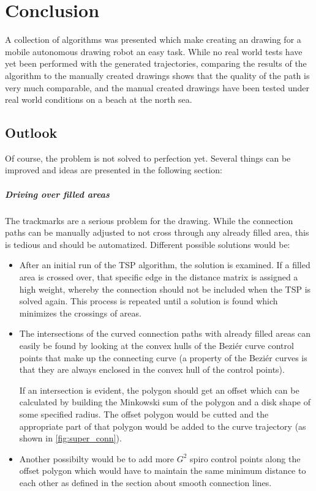 \chapter{Conclusion}

A collection of algorithms was presented which make creating an drawing for a mobile autonomous drawing robot an easy task. While no real world tests have yet been performed with the generated trajectories, comparing the results of the algorithm to the manually created drawings shows that the quality of the path is very much comparable, and the manual created drawings have been tested under real world conditions on a beach at the north sea.

\section{Outlook}
Of course, the problem is not solved to perfection yet. Several things can be improved and ideas are presented in the following section:

\paragraph{Driving over filled areas} The trackmarks are a serious problem for the drawing. While the connection paths can be manually adjusted to not cross through any already filled area, this is tedious and should be automatized. Different possible solutions would be:
\begin{itemize}
\item After an initial run of the TSP algorithm, the solution is examined. If a filled area is crossed over, that specific edge in the distance matrix is assigned a high weight, whereby the connection should not be included when the TSP is solved again. This process is repeated until a solution is found which minimizes the crossings of areas.
\item The intersections of the curved connection paths with already filled areas can easily be found by looking at the convex hulls of the Beziér curve control points that make up the connecting curve (a property of the Beziér curves is that they are always enclosed in the convex hull of the control points). 

If an intersection is evident, the polygon should get an offset which can be calculated by building the Minkowski sum of the polygon and a disk shape of some specified radius.  The offset polygon would be cutted and the appropriate part of that polygon would be added to the curve trajectory (as shown in \autoref{fig:super_conn}).
\item Another possibilty would be to add more $G^2$ spiro control points along the offset polygon which would have to maintain the same minimum distance to each other as defined in the section about smooth connection lines.
\end{itemize}

